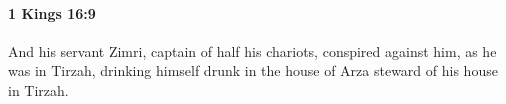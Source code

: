 
		\paragraph{1 Kings 16:9} %
			\label{1KINGS-16-9}

			And his servant Zimri, captain of half his chariots, conspired against him, as he was in Tirzah, drinking himself drunk in the house of Arza steward of his house in Tirzah.


